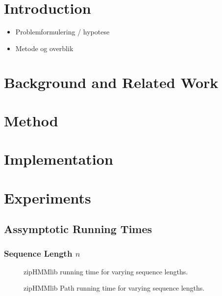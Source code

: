 \documentclass[oneside,a4,danish,english,report]{memoir}
\begin{document}
\tableofcontents

\mainmatter{}

\chapter{Introduction}
\label{cha:introduction}

\begin{itemize}
\item Problemformulering / hypotese
\item Metode og overblik
\end{itemize}

\chapter{Background and Related Work}
\label{cha:backgr-relat-work}

\chapter{Method}
\label{cha:method}

\chapter{Implementation}
\label{cha:implementation}

\chapter{Experiments}
\label{cha:experiments}

\section{Assymptotic Running Times}
\label{sec:assymp-runn-times}

\subsection{Sequence Length $n$}
\label{sec:sequence-length-n}

\begin{figure}[H]
  \centering
  
  \caption{zipHMMlib running time for varying sequence lengths.}
  \label{fig:assymptotic_viterbi_n}
\end{figure}

\begin{figure}[H]
  \centering
  
  \caption{zipHMMlib Path running time for varying sequence lengths.}
  \label{fig:assymptotic_viterbi_path_n}
\end{figure}
\end{document}
